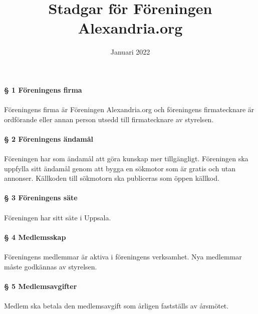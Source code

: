 \documentclass[12pt, a4paper]{article}
\title{Stadgar för Föreningen Alexandria.org}
\date{Januari 2022}
\begin{document}
\maketitle

\paragraph{§ 1 Föreningens firma}
\paragraph{}
Föreningens firma är Föreningen Alexandria.org och föreningens firmatecknare är ordförande eller annan person utsedd till firmatecknare av styrelsen.

\paragraph{§ 2 Föreningens ändamål}
\paragraph{}
Föreningen har som ändamål att göra kunskap mer tillgängligt. Föreningen ska uppfylla sitt ändamål genom att bygga en sökmotor som är gratis och utan annonser. Källkoden till sökmotorn ska publiceras som öppen källkod.

\paragraph{§ 3 Föreningens säte}
\paragraph{}
Föreningen har sitt säte i Uppsala.

\paragraph{§ 4 Medlemsskap}
\paragraph{}
Föreningens medlemmar är aktiva i föreningens verksamhet. Nya medlemmar måste godkännas av styrelsen.

\paragraph{§ 5 Medlemsavgifter}
\paragraph{}
Medlem ska betala den medlemsavgift som årligen fastställs av årsmötet.
\end{document}
